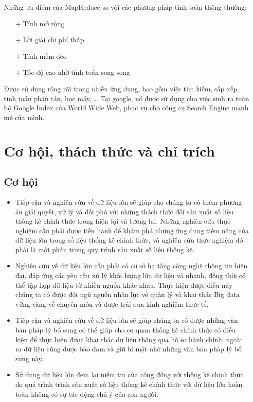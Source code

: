 \documentclass[12pt]{report}
\begin{document}
Những ưu điểm của MapReduce so với các phương pháp tính toán thông thường:
\begin{itemize}
\item[+] Tính mở rộng
\item[+] Lời giải chi phí thấp
\item[+] Tính mềm dẻo
\item[+] Tốc độ cao nhờ tính toán song song
\end{itemize}

Được sử dụng rộng rãi trong nhiều ứng dụng, bao gồm việc tìm kiếm, sắp xếp, tính toán phân tán, học máy, … Tại google, nó được sử dụng cho việc sinh ra toàn bộ Google Index của World Wide Web, phục vụ cho công cụ Search Engine mạnh mẽ của mình.


\chapter*{Cơ hội, thách thức và chỉ trích}
\section*{Cơ hội}
\begin{itemize}
\item
Tiếp cận và nghiên cứu về dữ liệu lớn sẽ giúp cho chúng ta có thêm phương án giải quyết, xử lý và đối phó với những thách thức đối sản xuất số liệu thống kê chính thức trong hiện tại và tương lai. Những nghiên cứu thực nghiệm cần phải được tiến hành để khám phá những ứng dụng tiềm năng của dữ liệu lớn trong số liệu thống kê
chính thức, và nghiên cứu thực nghiệm đó phải là một phần trong quy trình sản xuất
số liệu thống kê.
\item
Nghiên cứu về dữ liệu lớn cần phải có cơ sở hạ tầng công nghệ thông tin hiện đại,
đáp ứng các yêu cầu xử lý khối lượng lớn dữ liệu và nhanh, đồng thời có thể tập hợp
dữ liệu từ nhiều nguồn khác nhau. Thực hiện được điều này chúng ta có được đội ngũ
nguồn nhân lực về quản lý và khai thác Big data vững vàng về chuyên môn và được
trải qua kinh nghiệm thực tế.
\item
Tiếp cận và nghiên cứu về dữ liệu lớn sẽ giúp chúng ta có được những văn bản
pháp lý bổ sung có thể giúp cho cơ quan thống kê chính thức có điều kiện để thực
hiện được khai thác dữ liệu thông qua hồ sơ hành chính, ngoài ra dữ liệu cũng được
bảo đảm và giữ bí mật nhờ những văn bản pháp lý bổ sung này.
\item
Sử dụng dữ liệu lớn đem lại niềm tin của cộng đồng với thống kê chính thức do
quá trình trình sản xuất số liệu thống kê chính thức với dữ liệu lớn hoàn toàn không có
sự tác động chủ ý của con người.
\end{itemize}
\end{document}
